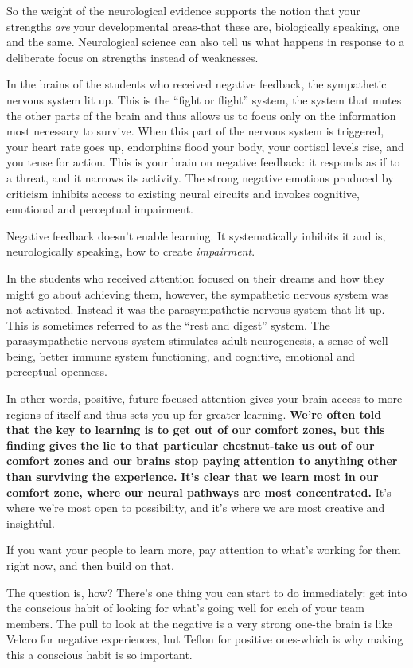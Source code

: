 \documentclass[ebook,12pt,oneside,openany]{memoir}
\begin{document}
So the weight of the neurological evidence supports the notion that your strengths \textit{are}
your developmental areas-that these are, biologically speaking, one and the same. 
Neurological science can also tell us what happens in response to a deliberate focus on strengths 
instead of weaknesses.

In the brains of the students who received negative feedback, the sympathetic nervous system lit up.
This is the ``fight or flight'' system, the system that mutes the other parts of the brain and thus
allows us to focus only on the information most necessary to survive.
When this part of the nervous system is triggered, your heart rate goes up, endorphins flood your body,
your cortisol levels rise, and you tense for action.
This is your brain on negative feedback: it responds as if to a threat, and it narrows its activity.
The strong negative emotions produced by criticism inhibits access to existing neural circuits and invokes 
cognitive, emotional and perceptual impairment.

Negative feedback doesn't enable learning. It systematically inhibits it and is, 
neurologically speaking, how to create \textit{impairment}.

In the students who received attention focused on their dreams and how they might 
go about achieving them, however, the sympathetic nervous system was not activated.
Instead it was the parasympathetic nervous system that lit up.
This is sometimes referred to as the ``rest and digest'' system.
The parasympathetic nervous system stimulates adult neurogenesis, a sense of well being, 
better immune system functioning, and cognitive, emotional and perceptual openness.

In other words, positive, future-focused attention gives your brain access to more regions of itself
and thus sets you up for greater learning. \textbf{We're often told that the key to learning is to get out of our comfort zones,
but this finding gives the lie to that particular chestnut-take us out of our comfort zones and our brains stop 
paying attention to anything other than surviving the experience.}
\textbf{It's clear that we learn most in our comfort zone, where our neural pathways are most concentrated.}
It's where we're most open to possibility, and it's where we are most creative and insightful.

If you want your people to learn more, pay attention to what's working for them right now, and then build on that.

The question is, how? There's one thing you can start to do immediately: 
get into the conscious habit of looking for what's going well for each of your team members.
The pull to look at the negative is a very strong one-the brain is like Velcro for negative experiences, 
but Teflon for positive ones-which is why making this a conscious habit is so important.
\end{document}
